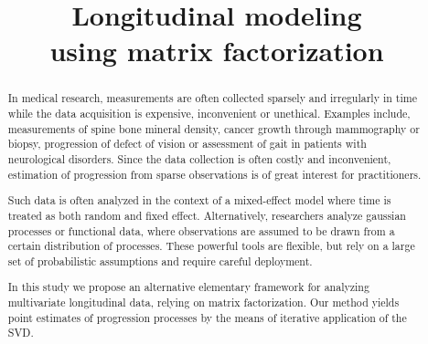 \documentclass[preprint]{imsart}
\numberwithin{equation}{section}
\theoremstyle{plain}
\begin{document}
\begin{frontmatter}
\title{Longitudinal modeling\\using matrix factorization}



\begin{abstract}
  In medical research, measurements are often collected sparsely and irregularly in time while the data acquisition is expensive, inconvenient or unethical. Examples include, measurements of spine bone mineral density, cancer growth through mammography or biopsy, progression of defect of vision or assessment of gait in patients with neurological disorders. Since the data collection is often costly and inconvenient, estimation of progression from sparse observations is of great interest for practitioners.

  Such data is often analyzed in the context of a mixed-effect model where time is treated as both random and fixed effect. Alternatively, researchers analyze gaussian processes or functional data, where observations are assumed to be drawn from a certain distribution of processes. These powerful tools are flexible, but rely on a large set of probabilistic assumptions and require careful deployment.
  
  In this study we propose an alternative elementary framework for analyzing multivariate longitudinal data, relying on matrix factorization. Our method yields point estimates of progression processes by the means of iterative application of the SVD.

  
\end{abstract}

\begin{keyword}[class=MSC]
\end{keyword}

\begin{keyword}
\end{keyword}

\end{frontmatter}
\end{document}
